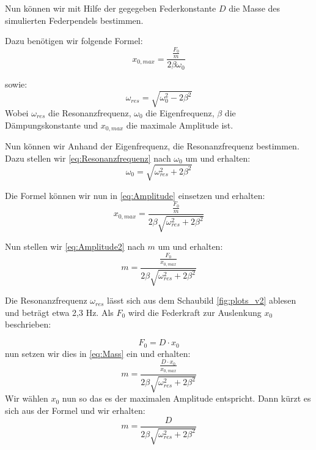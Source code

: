             Nun können wir mit Hilfe der gegegeben Federkonstante $D$ die Masse des simulierten Federpendels bestimmen.

            Dazu benötigen wir folgende Formel:
            \begin{equation}
                x_{0,max}=\frac{\frac{F_0}{m}}{2\beta\omega_0}
                \label{eq:Amplitude}
            \end{equation}

            sowie:
            \begin{equation}
                \omega_{res}=\sqrt{\omega_0^2-2\beta^2}
                \label{eq:Resonanzfrequenz}
            \end{equation}
            Wobei $\omega_{res}$ die Resonanzfrequenz, $\omega_0$ die Eigenfrequenz, $\beta$ die Dämpungskonstante und $x_{0,max}$ die maximale Amplitude ist. 

            Nun können wir Anhand der Eigenfrequenz, die Resonanzfrequenz bestimmen. Dazu stellen wir \ref{eq:Resonanzfrequenz} nach $\omega_{0}$ um und erhalten:
            \begin{equation}
                \omega_{0}=\sqrt{\omega_{res}^2+2\beta^2}
                \label{eq:Eigenfrequenz}
            \end{equation}

            Die Formel können wir nun in \ref{eq:Amplitude} einsetzen und erhalten:
            \begin{equation}
                x_{0,max}=\frac{\frac{F_0}{m}}{2\beta\sqrt{\omega_{res}^2+2\beta^2}}
                \label{eq:Amplitude2}
            \end{equation}

            Nun stellen wir \ref{eq:Amplitude2} nach $m$ um und erhalten:
            \begin{equation}
                m=\frac{\frac{F_0}{x_{0,max}}}{2\beta\sqrt{\omega_{res}^2+2\beta^2}}
                \label{eq:Mass}
            \end{equation}

            Die Resonanzfrequenz $\omega_{res}$ lässt sich aus dem Schaubild \ref{fig:plots_v2} ablesen und beträgt etwa 2,3 Hz. Als $F_0$ wird die Federkraft zur Auslenkung $x_0$ beschrieben:

            \begin{equation}
                F_0=D\cdot x_0
                \label{eq:Federkraft}
            \end{equation} nun setzen wir dies in \ref{eq:Mass} ein und erhalten:
            \begin{equation}
                m=\frac{\frac{D\cdot x_0}{x_{0,max}}}{2\beta\sqrt{\omega_{res}^2+2\beta^2}}
                \label{eq:Mass2}
            \end{equation}
            Wir wählen $x_0$ nun so das es der maximalen Amplitude entspricht. Dann kürzt es sich aus der Formel und wir erhalten:
            \begin{equation}
                m=\frac{D}{2\beta\sqrt{\omega_{res}^2+2\beta^2}}
                \label{eq:Mass3}
            \end{equation}

